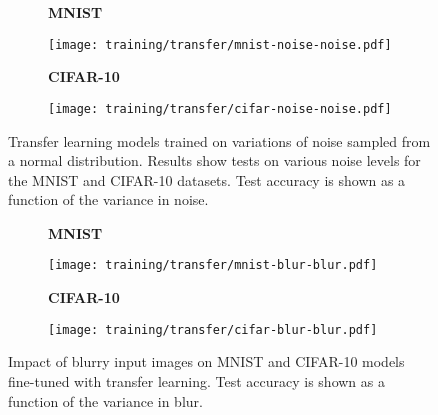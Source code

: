 \documentclass[conference]{IEEEtran}
\begin{document}
\begin{figure}[H]
    \centering
    \begin{subfigure}[h]{0.30\textwidth}
        \centering
        \textbf{MNIST}\par\medskip
        \texttt{[image: training/transfer/mnist-noise-noise.pdf]}
        \caption{} 
        \label{fig:transfer-mnist-noise}
    \end{subfigure}
    \quad
    \begin{subfigure}[h]{0.30\textwidth}  
        \centering 
        \textbf{CIFAR-10}\par\medskip
        \texttt{[image: training/transfer/cifar-noise-noise.pdf]}
        \caption{} 
        \label{fig:transfer-cifar-noise}
    \end{subfigure}
    \captionsetup{width=0.80\linewidth}
    \caption{Transfer learning models trained on variations of noise sampled from a normal distribution. Results show tests on various noise levels for the MNIST and CIFAR-10 datasets. Test accuracy is shown as a function of the variance in noise.} 
    \label{fig:transfer-noise}
\end{figure}

\begin{figure}[H]
    \centering
    \begin{subfigure}[h]{0.30\textwidth}
        \centering
        \textbf{MNIST}\par\medskip
        \texttt{[image: training/transfer/mnist-blur-blur.pdf]}
        \caption{} 
        \label{fig:transfer-mnist-blur}
    \end{subfigure}
    \quad
    \begin{subfigure}[h]{0.30\textwidth}  
        \centering 
        \textbf{CIFAR-10}\par\medskip
        \texttt{[image: training/transfer/cifar-blur-blur.pdf]}
        \caption{} 
        \label{fig:transfer-cifar-blur}
    \end{subfigure}
    \captionsetup{width=0.80\linewidth}
    \caption{Impact of blurry input images on MNIST and CIFAR-10 models fine-tuned with transfer learning. Test accuracy is shown as a function of the variance in blur.} 
    \label{fig:transfer-blur}
\end{figure}
\end{document}
